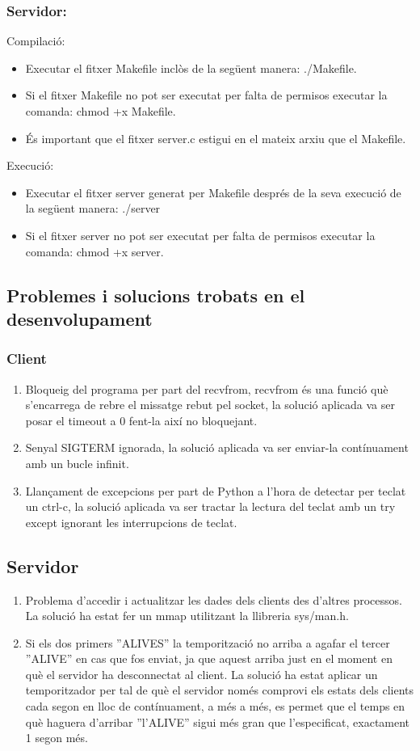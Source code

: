 \documentclass[11pt]{article}
\begin{document}
\subsubsection*{Servidor:}
Compilació:
\begin{itemize}
\item Executar el fitxer Makefile inclòs de la següent manera: ./Makefile.
\item Si el fitxer Makefile no pot ser executat per falta de permisos executar la comanda: chmod +x Makefile.
\item És important que el fitxer server.c estigui en el mateix arxiu que el Makefile.
\end{itemize}
Execució:
\begin{itemize}
\item Executar el fitxer server generat per Makefile després de la seva execució de la següent manera: ./server
\item Si el fitxer server no pot ser executat per falta de permisos executar la comanda: chmod +x server.
\end{itemize}
\subsection{Problemes i solucions trobats en el desenvolupament}
\subsubsection*{Client}
\begin{enumerate}
\item Bloqueig del programa per part del recvfrom, recvfrom és una funció què s'encarrega de rebre el missatge rebut pel socket, la solució aplicada va ser posar el timeout a 0 fent-la així no bloquejant.
\item Senyal SIGTERM ignorada, la solució aplicada va ser enviar-la contínuament amb un bucle infinit.
\item Llançament de excepcions per part de Python a l'hora de detectar per teclat un ctrl-c, la solució aplicada va ser tractar la lectura del teclat amb un try except ignorant les interrupcions de teclat.
\end{enumerate}
\subsection*{Servidor}
\begin{enumerate}
\item Problema d'accedir i actualitzar les dades dels clients des d'altres processos. La solució ha estat fer un mmap utilitzant la llibreria sys/man.h.
\item Si els dos primers ''ALIVES'' la temporització no arriba a agafar el tercer ''ALIVE'' en cas que fos enviat, ja que aquest arriba just en el moment en què el servidor ha desconnectat al client. La solució ha estat aplicar un temporitzador per tal de què el servidor només comprovi els estats dels clients cada segon en lloc de contínuament, a més a més, es permet que el temps en què haguera d'arribar ''l'ALIVE'' sigui més gran que l'especificat, exactament 1 segon més.
\end{enumerate}
\end{document}
